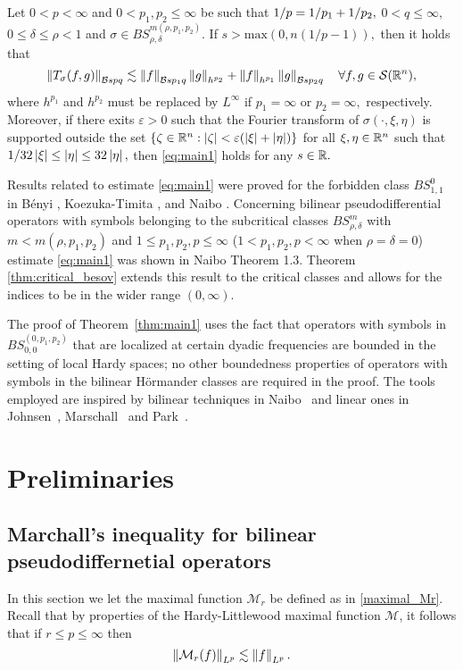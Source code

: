 \begin{theorem} \label{thm:main1}
Let $0<p<\infty$ and  $0<p_1,p_2\le \infty$ be such that $1/p=1/p_1+1/p_2,$ $0<q\le \infty,$   $0\le\delta\le \rho<1$ and   $\sigma\in BS^{m(\rho,p_1,p_2)}_{\rho,\delta}.$ If $s>\text{max}(0,n(1/p - 1)),$ then it holds that
\begin{equation}\label{eq:main1}
\left\|T_\sigma(f,g)\right\|_{\mathcal{B}{s}{p}{q}}\lesssim \left\|f\right\|_{\mathcal{B}{s}{p_1}{q}}\left\|g\right\|_{h^{p_2}} +\left\|f\right\|_{h^{p_1}}\left\|g\right\|_{\mathcal{B}{s}{p_2}{q}}\quad \forall f,g\in {\mathcal{S}}({{\mathbb R}^n}),
\end{equation}
where $h^{p_1}$ and $h^{p_2}$ must be replaced by $L^\infty$ if $p_1=\infty$ or $p_2=\infty,$ respectively. Moreover,  if there exits $\varepsilon>0$ such that the Fourier transform of  $\sigma(\cdot,\xi,\eta)$ is  supported outside the set  $\{\zeta\in{{\mathbb R}^n}:\left\vert \zeta \right\vert<\varepsilon (\left\vert \xi \right\vert+\left\vert \eta \right\vert)\}$ for all  $\xi,\eta\in{{\mathbb R}^n}$ such that $1/32\left\vert \xi \right\vert\le \left\vert \eta \right\vert\le 32 \left\vert \eta \right\vert,$ then \eqref{eq:main1} holds for any $s\in\mathbb{R}.$
\end{theorem}

Results related to estimate \ref{eq:main1} were proved for the forbidden class $BS^0_{1,1}$ in B\'enyi \cite{MR1996120}, Koezuka-Timita \cite{MR3750316}, and Naibo \citep{MR3393696}. Concerning bilinear pseudodifferential operators with symbols belonging to the subcritical classes $BS^m_{\rho,\delta}$ with $m<m(\rho,p_1,p_2)$ and $1\leq p_1,p_2,p \leq \infty$ ($1 < p_1,p_2,p < \infty$ when $\rho = \delta = 0$) estimate \ref{eq:main1} was shown in Naibo \citep{MR3393696} Theorem 1.3. Theorem \ref{thm:critical_besov} extends this result to the critical classes and allows for the indices to be in the wider range $(0,\infty)$. 

The proof of Theorem~\ref{thm:main1} uses the fact that operators with symbols in $BS^{(0,p_1,p_2)}_{0,0}$ that are localized at certain dyadic frequencies are bounded in the setting of local Hardy spaces; no other boundedness properties of operators with symbols in the bilinear H\"ormander classes are required in the proof. The tools employed are inspired by bilinear techniques in Naibo~\cite{MR3393696} and linear ones in   Johnsen~\cite{MR2163627}, Marschall~\cite{MR1376592} and   Park~\cite{MR3759556}.

\section{Preliminaries}


\subsection{Marchall's inequality for bilinear pseudodiffernetial operators}
In this section we let the maximal function $\mathcal{M}_r$ be defined as in \ref{maximal_Mr}. Recall that by properties of the Hardy-Littlewood maximal function $\mathcal{M}$, it follows that if $r\leq p\leq \infty$ then 
\begin{equation}
\left\|\mathcal{M}_r(f)\right\|_{L^p} \lesssim \left\|f\right\|_{L^p}.
\end{equation}


